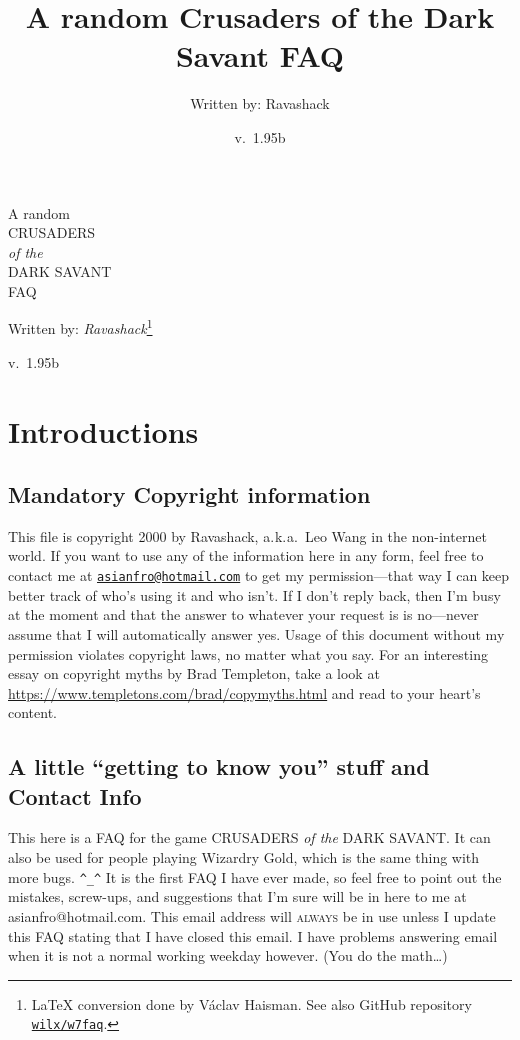 \documentclass[11pt,twoside,openright]{report}
\title{A random Crusaders of the Dark Savant FAQ}
\author{Written by: Ravashack}
\date{v.\ 1.95b}
\newcommand\textlcsc[1]{\texorpdfstring{\textsc{\MakeLowercase{#1}}}{#1}}
\DeclareRobustCommand{\CotDS}{%
  {\addfontfeature{StylisticSet=2}\uppercase{Crusaders} {\fontspec{EB Garamond}\textit{of the}} \uppercase{Dark Savant}}}
\begin{document}
\begin{titlepage}
  \centering
  {\Huge A random\\\uppercase{Crusaders}\\{\textit{of the}}\\\uppercase{Dark Savant}\\FAQ\par}
  \vspace{1.5cm}
  {\Large Written by: \textit{Ravashack}\protect\footnote{\LaTeX{} conversion done by Václav Haisman.
See also GitHub repository \href{https://github.com/wilx/w7faq}{\texttt{wilx/w7faq}}.}\par}
  \vspace{1.5cm}
  {\large v.\ 1.95b\par}
  \vfill


\end{titlepage}
\mbox{}
\thispagestyle{empty}
\newpage

\chapter*{Introductions}%
%
\section{Mandatory Copyright
information}\label{mandatory-copyright-information}%
%
This file is copyright 2000 by Ravashack, a. k. a.\ Leo Wang in the non-internet
world. If you want to use any of the information here in any form, feel free
to contact me at
\href{mailto:asianfro@hotmail.com}{\nolinkurl{asianfro@hotmail.com}} to get
my permission---that way I can keep better track of who's using it and who
isn't. If I don't reply back, then I'm busy at the moment and that the answer
to whatever your request is is no---never assume that I will automatically
answer yes. Usage of this document without my permission violates copyright
laws, no matter what you say. For an interesting essay on copyright myths by
Brad Templeton, take a look at
\url{https://www.templetons.com/brad/copymyths.html} and read to your heart's
content.

\section{\texorpdfstring{A little ``getting to know you'' stuff and
Contact
Info}{A little getting to know you stuff and Contact Info}}\label{a-little-getting-to-know-you-stuff-and-contact-info}%
%
This here is a FAQ for the game \CotDS. It can also be
used for people playing Wizardry Gold, which is the same thing with more
bugs. \verb|^_^| It is the first FAQ I have ever made, so feel free
to point out the mistakes, screw-ups, and suggestions that I'm sure will be
in here to me at asianfro@hotmail.com. This email address will
\textlcsc{ALWAYS} be in use unless I update this FAQ stating that I have
closed this email. I have problems answering email when it is not a normal
working weekday however. (You do the math\ldots{})
\end{document}
